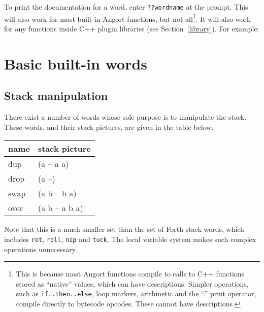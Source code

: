 To print the documentation for a word, enter \texttt{??wordname} at
the prompt. This will also work for most built-in Angort functions,
but not all\footnote{This is because most Angort functions compile
to calls to C++ functions stored as ``native'' values,
which can have descriptions. Simpler operations,
such as \texttt{if..then..else}, loop markers, arithmetic and the ``.'' print operator, compile directly to bytecode opcodes.
These cannot have descriptions.}. It will also work for any functions
inside C++ plugin libraries (see Section~\ref{library}). For example:


\section{Basic built-in words}
\subsection{Stack manipulation}
There exist a number of words whose sole purpose is to manipulate
the stack. These words, and their stack pictures, are given in the table
below.
\begin{center}
\begin{tabular}{|l|p{4in}|}\hline
\textbf{name} & \textbf{stack picture}\\ \hline
dup & (a -- a a)\\
drop & (a --)\\
swap & (a b -- b a)\\
over & (a b -- a b a)\\
\hline
\end{tabular}
\end{center}
Note that this is a much smaller set than the set of Forth stack
words, which includes \texttt{rot}, \texttt{roll}, \texttt{nip} and \texttt{tuck}.
The local variable system makes such complex operations unnecessary.

